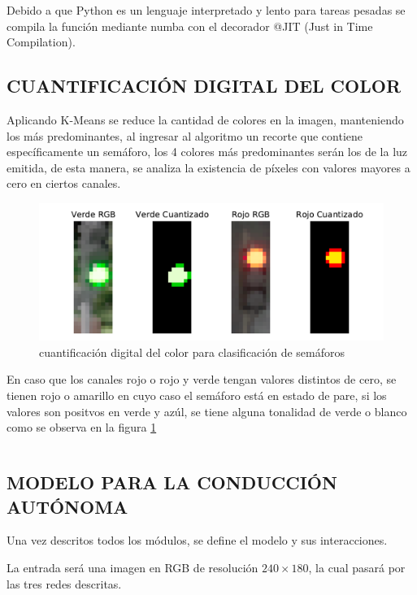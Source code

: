		Debido a que Python es un lenguaje interpretado y lento para tareas pesadas se compila la función mediante numba con el decorador @JIT (Just in Time Compilation).
		
	\subsection{CUANTIFICACIÓN DIGITAL DEL COLOR}
		Aplicando K-Means se reduce la cantidad de colores en la imagen, manteniendo los más predominantes, al ingresar al algoritmo un recorte que contiene específicamente un semáforo, los 4 colores más predominantes serán los de la luz emitida, de esta manera, se analiza la existencia de píxeles con valores mayores a cero en ciertos canales.
		
		\begin{figure}[H]
			\centering
			\includegraphics[scale=0.65]{imagenes/sign}
			\caption[Cuantificación digital del color]{cuantificación digital del color para clasificación de semáforos}
			\label{semaforo}
		\end{figure}
		
		En caso que los canales rojo o rojo y verde tengan valores distintos de cero, se tienen rojo o amarillo en cuyo caso el semáforo está en estado de pare, si los valores son positvos en verde y azúl, se tiene alguna tonalidad de verde o blanco como se observa en la figura \ref{semaforo}
		
		\inputminted[frame=lines,
		baselinestretch=1,
		fontsize=\footnotesize,
		autogobble]{python}{codigos/marco-aplicativo/kmeans.py}
				
	\subsection{MODELO PARA LA CONDUCCIÓN AUTÓNOMA}
		Una vez descritos todos los módulos, se define el modelo y sus interacciones.
		
		La entrada será una imagen en RGB de resolución $240\times180$, la cual pasará por las tres redes descritas.
		
